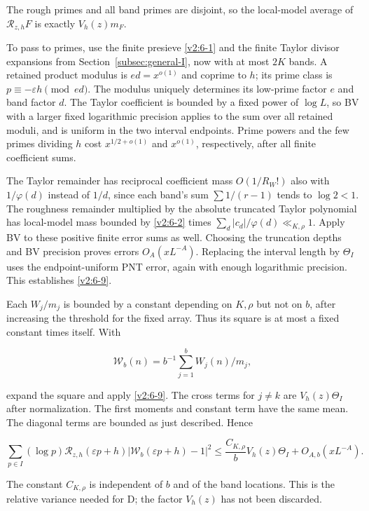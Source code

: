 \documentclass[11pt]{article}
\theoremstyle{definition}
\theoremstyle{remark}
\numberwithin{equation}{section}
\begin{document}
The rough primes and all band primes are disjoint, so the local-model average of $\mathcal R_{z,h}F$ is exactly $V_h(z)m_F$.

To pass to primes, use the finite presieve \eqref{v2:6-1} and the finite Taylor divisor expansions from Section~\ref{subsec:general-I}, now with at most $2K$ bands. A retained product modulus is $ed=x^{o(1)}$ and coprime to $h$; its prime class is $p\equiv-\varepsilon h\pmod{ed}$. The modulus uniquely determines its low-prime factor $e$ and band factor $d$. The Taylor coefficient is bounded by a fixed power of $\log L$, so BV with a larger fixed logarithmic precision applies to the sum over all retained moduli, and is uniform in the two interval endpoints. Prime powers and the few primes dividing $h$ cost $x^{1/2+o(1)}$ and $x^{o(1)}$, respectively, after all finite coefficient sums.

The Taylor remainder has reciprocal coefficient mass $O(1/R_W!)$ also with $1/\varphi(d)$ instead of $1/d$, since each band's sum $\sum1/(r-1)$ tends to $\log2<1$. The roughness remainder multiplied by the absolute truncated Taylor polynomial has local-model mass bounded by \eqref{v2:6-2} times $\sum_d|c_d|/\varphi(d)\ll_{K,\rho}1$. Apply BV to these positive finite error sums as well. Choosing the truncation depths and BV precision proves errors $O_A(xL^{-A})$. Replacing the interval length by $\Theta_I$ uses the endpoint-uniform PNT error, again with enough logarithmic precision. This establishes \eqref{v2:6-9}.

Each $W_j/m_j$ is bounded by a constant depending on $K,\rho$ but not on $b$, after increasing the threshold for the fixed array. Thus its square is at most a fixed constant times itself. With


\begin{equation}
\mathcal W_b(n)=b^{-1}\sum_{j=1}^bW_j(n)/m_j,
\end{equation}


expand the square and apply \eqref{v2:6-9}. The cross terms for $j\ne k$ are $V_h(z)\Theta_I$ after normalization. The first moments and constant term have the same mean. The diagonal terms are bounded as just described. Hence


\begin{equation}\label{v2:6-11}
\sum_{p\in I}(\log p)\mathcal R_{z,h}(\varepsilon p+h)
 |\mathcal W_b(\varepsilon p+h)-1|^2
\le \frac{C_{K,\rho}}b V_h(z)\Theta_I+O_{A,b}(xL^{-A}).
\end{equation}


The constant $C_{K,\rho}$ is independent of $b$ and of the band locations. This is the relative variance needed for D; the factor $V_h(z)$ has not been discarded.
\end{document}
